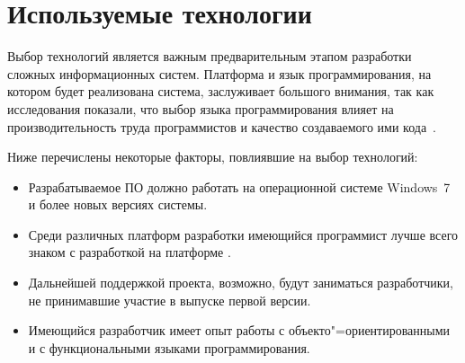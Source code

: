 
\lstset{style=fsharpstyle}

\section{Используемые технологии} 
\label{sec:practice:technology_used}

Выбор технологий является важным предварительным этапом разработки сложных информационных систем.
Платформа и язык программирования, на котором будет реализована система, заслуживает большого внимания, так как исследования показали, что выбор языка программирования влияет на производительность труда программистов и качество создаваемого ими кода~\cite[c.~59]{mcconnell_2005}.

Ниже перечислены некоторые факторы, повлиявшие на выбор технологий:
\begin{itemize}
\item Разрабатываемое ПО должно работать на операционной системе Windows~7 и более новых версиях системы.
\item Среди различных платформ разработки имеющийся программист лучше всего знаком с разработкой на платформе \dotnet{}.
\item Дальнейшей поддержкой проекта, возможно, будут заниматься разработчики, не принимавшие участие в выпуске первой версии.
\item Имеющийся разработчик имеет опыт работы с объекто"=ориентированными и с функциональными языками программирования.
\end{itemize}

